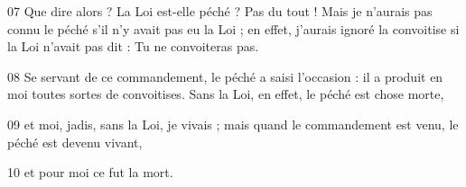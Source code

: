
07 Que dire alors ? La Loi est-elle péché ? Pas du tout ! Mais je n’aurais pas connu le péché s’il n’y avait pas eu la Loi ; en effet, j’aurais ignoré la convoitise si la Loi n’avait pas dit : Tu ne convoiteras pas.

08 Se servant de ce commandement, le péché a saisi l’occasion : il a produit en moi toutes sortes de convoitises. Sans la Loi, en effet, le péché est chose morte,

09 et moi, jadis, sans la Loi, je vivais ; mais quand le commandement est venu, le péché est devenu vivant,

10 et pour moi ce fut la mort.